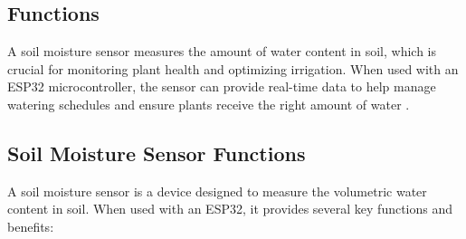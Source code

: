 \subsection{Functions}
A soil moisture sensor measures the amount of water content in soil, which is crucial for monitoring plant health and optimizing irrigation. When used with an ESP32 microcontroller, the sensor can provide real-time data to help manage watering schedules and ensure plants receive the right amount of water \cite{Chhorn:2022}.

\subsection*{Soil Moisture Sensor Functions}

A soil moisture sensor is a device designed to measure the volumetric water \cite{Daniel:2021} content in soil. When used with an ESP32, it provides several key functions and benefits:

